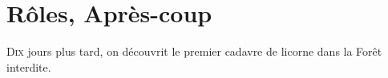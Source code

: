 \chapter{Rôles, Après-coup}

\lettrine{D}{ix} jours plus tard, on découvrit le premier cadavre de licorne dans la Forêt interdite.
